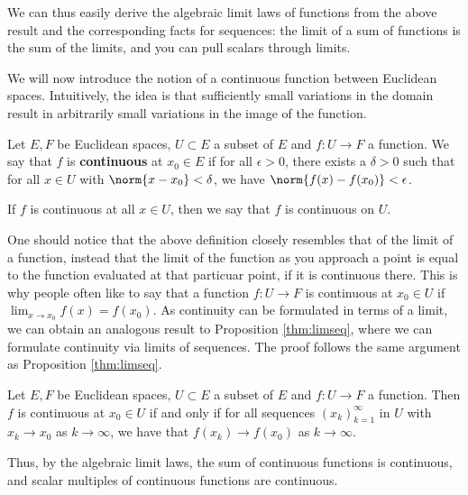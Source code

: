  We can thus easily derive the algebraic limit laws of functions from the above result and the corresponding facts for sequences: the limit of a sum of functions is the sum of the limits, and you can pull scalars through limits.

 \vspace{3mm}

 We will now introduce the notion of a continuous function between Euclidean spaces. Intuitively, the idea is that sufficiently small variations in the domain result in arbitrarily small variations in the image of the function.

 \begin{definition}
   Let \( E, F \) be Euclidean spaces, \( U\subset E \) a subset of \( E \) and \( f:U\to F \) a function. We say that \( f \) is \textbf{continuous} at \( x_0\in E \) if for all \( \epsilon>0 \), there exists a \( \delta>0 \) such that for all \( x\in U \) with \( \norm{x-x_0}<\delta \), we have \( \norm{f(x)-f(x_0)}<\epsilon \).

   \vspace{3mm}

   If \( f \) is continuous at all \( x\in U \), then we say that \( f \) is continuous on \( U \).
 \end{definition}

 One should notice that the above definition closely resembles that of the limit of a function, instead that the limit of the function as you approach a point is equal to the function evaluated at that particuar point, if it is continuous there. This is why people often like to say that a function \( f:U\to F \) is continuous at \( x_0\in U \) if \( \lim_{x\to x_0}f(x)=f(x_0) \). As continuity can be formulated in terms of a limit, we can obtain an analogous result to Proposition \ref{thm:limseq}, where we can formulate continuity via limits of sequences. The proof follows the same argument as Proposition \ref{thm:limseq}.

 \begin{proposition}
   \label{thm:seqcont}
   Let \( E, F \) be Euclidean spaces, \( U\subset E \) a subset of \( E \) and \( f:U\to F \) a function. Then \( f \) is continuous at \( x_0\in U \) if and only if for all sequences \( (x_k)_{k=1}^\infty \) in \( U \) with \( x_k\to x_0 \) as \( k\to\infty \), we have that \( f(x_k)\to f(x_0) \) as \( k\to\infty \).
 \end{proposition}

 Thus, by the algebraic limit laws, the sum of continuous functions is continuous, and scalar multiples of continuous functions are continuous.

